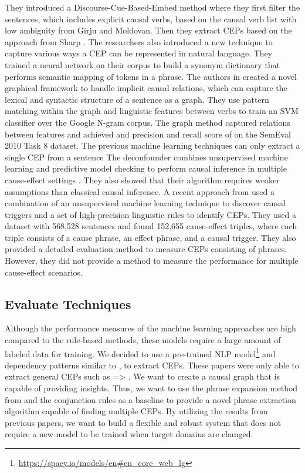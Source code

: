 They introduced a Discourse-Cue-Based-Embed method where they first filter the sentences, which includes explicit causal verbs, based on the causal verb list with low ambiguity from Girju and Moldovan\cite{girju2002text}.
Then they extract \ac{CEP}s based on the approach from Sharp \cite{sharp2016creating}.
The researchers also introduced a new technique to capture various ways a \ac{CEP} can be represented in natural language.
They trained a neural network on their corpus to build a synonym dictionary that performs semantic mapping of tokens in a phrase.
The authors in \cite{rink2010learning} created a novel graphical framework to handle implicit causal relations, which can capture the lexical and syntactic structure of a sentence as a graph.
They use pattern matching within the graph and linguistic features between verbs to train an SVM classifier over the Google N-gram corpus.
The graph method captured relations between features and achieved and precision and recall score of  on the SemEval 2010 Task 8 dataset.
The previous machine learning techniques can only extract a single \ac{CEP} from a sentence
The deconfounder combines unsupervised machine learning and predictive model checking to perform causal inference in multiple cause-effect settings \cite{wang2019blessings}.
They also showed that their algorithm requires weaker assumptions than classical causal inference.
A recent approach from \cite{pawar2021knowledge} used a combination of an unsupervised machine learning technique to discover causal triggers and a set of high-precision linguistic rules to identify \ac{CEP}s.
They used a dataset with 568,528 sentences and found 152,655 cause-effect triples, where each triple consists of a cause phrase, an effect phrase, and a causal trigger.
They also provided a detailed evaluation method to measure \ac{CEP}s consisting of phrases.
However, they did not provide a method to measure the performance for multiple cause-effect scenarios.

\subsection{Evaluate Techniques}\label{subsec:scope-of-the-thesis}
Although the performance measures of the machine learning approaches are high compared to the rule-based methods, these models require a large amount of labeled data for training.
We decided to use a pre-trained \ac{NLP} model\footnote{\url{https://spacy.io/models/en\#en_core_web_lg}} and dependency patterns similar to \cite{doan2019extracting, sorgente2013automatic}, to extract \ac{CEP}s.
These papers were only able to extract general \ac{CEP}s such as  => .
We want to create a causal graph that is capable of providing insights.
Thus, we want to use the phrase expansion method from \cite{sharp2016creating} and the conjunction rules \cite{sorgente2013automatic} as a baseline to provide a novel phrase extraction algorithm capable of finding multiple \ac{CEP}s.
By utilizing the results from previous papers, we want to build a flexible and robust system that does not require a new model to be trained when target domains are changed.


